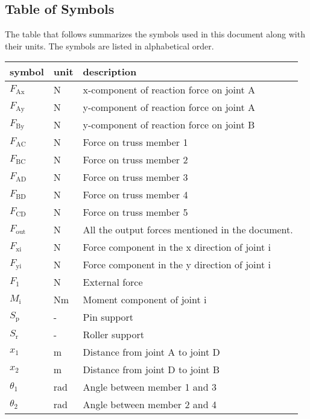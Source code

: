 \documentclass[12pt]{article}
\begin{document}
\subsection{Table of Symbols}

The table that follows summarizes the symbols used in this document along with
their units. The symbols are listed in alphabetical order.

\renewcommand{\arraystretch}{1.2}
\noindent \begin{longtable*}{l l p{12cm}} \toprule
\textbf{symbol} & \textbf{unit} & \textbf{description}\\
\midrule 
$F_\text{Ax}$ & \si{\newton} & x-component of reaction force on joint A \\
$F_\text{Ay}$ & \si{\newton} & y-component of reaction force on joint A \\ 
$F_\text{By}$ & \si{\newton} & y-component of reaction force on joint B \\
$F_\text{AC}$ & \si{\newton} & Force on truss member 1 \\
$F_\text{BC}$ & \si{\newton} & Force on truss member 2 \\
$F_\text{AD}$ & \si{\newton} & Force on truss member 3 \\
$F_\text{BD}$ & \si{\newton} & Force on truss member 4 \\
$F_\text{CD}$ & \si{\newton} & Force on truss member 5 \\
$F_\text{out}$ & \si{\newton} & All the output forces mentioned in the 
document. \\
$F_\text{xi}$ & \si{\newton} & Force component in the x direction of joint i \\
$F_\text{yi}$ & \si{\newton} & Force component in the y direction of joint i \\
$F_\text{1}$ & \si{\newton} & External force \\
$M_\text{i}$ & \si{\newton}\si{\metre} & Moment component of joint i \\
$S_\text{p}$ & - & Pin support \\
$S_\text{r}$ & - & Roller support \\
$x_\text{1}$ & \si{\meter} & Distance from joint A to joint D \\
$x_\text{2}$ & \si{\meter} & Distance from joint D to joint B \\
$\theta_\text{1}$ & \si{\radian} & Angle between member 1 and 3 \\
$\theta_\text{2}$ & \si{\radian} & Angle between member 2 and 4 \\
\bottomrule
\end{longtable*}
\end{document}
